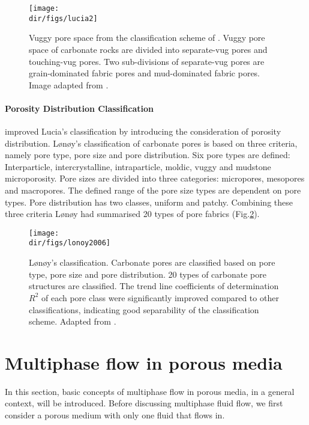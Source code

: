 \begin{figure}[htbp]
  \centering
  \texttt{[image: \\dir/figs/lucia2]}
  \caption{Vuggy pore space from the classification scheme of \citet{lucia1995rock}. Vuggy pore space of carbonate rocks are divided into separate-vug pores and touching-vug pores. Two sub-divisions of separate-vug pores are grain-dominated fabric pores and mud-dominated fabric pores. Image adapted from \citep{lucia1995rock}.}
  \label{vuggy}
\end{figure}

\paragraph{Porosity Distribution Classification}
\citet{lonoy2006making} improved Lucia's classification by introducing the consideration of porosity distribution. L{\o}n{\o}y's classification of carbonate pores is based on three criteria, namely pore type, pore size and pore distribution. Six pore types are defined: Interparticle, intercrystalline, intraparticle, moldic, vuggy and mudstone microporosity. Pore sizes are divided into three categories: micropores, mesopores and macropores. The defined range of the pore size types are dependent on pore types. Pore distribution has two classes, uniform and patchy. Combining these three criteria L{\o}n{\o}y had summarised 20 types of pore fabrics (Fig.\ref{lonoy}).

\begin{figure}[htbp]
  \centering
  \texttt{[image: \\dir/figs/lonoy2006]}
  \caption{L{\o}n{\o}y's classification. Carbonate pores are classified based on pore type, pore size and pore distribution. 20 types of carbonate pore structures are classified. The trend line coefficients of determination $R^2$ of each pore class were significantly improved compared to other classifications, indicating good separability of the classification scheme. Adapted from \citet {lonoy2006making}.}
  \label{lonoy}
\end{figure}

\section{Multiphase flow in porous media}
In this section, basic concepts of multiphase flow in porous media, in a general context, will be introduced. Before discussing multiphase fluid flow, we first consider a porous medium with only one fluid that flows in.


